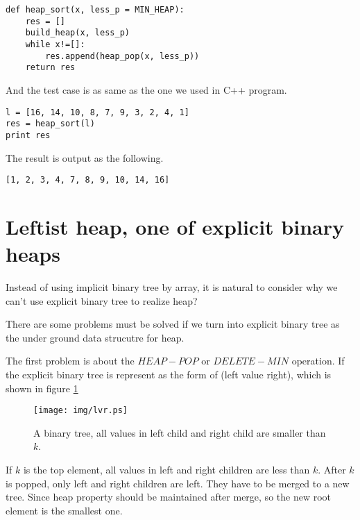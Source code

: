 \documentclass{article}
\begin{document}
\lstset{language=Python}
\begin{lstlisting}
def heap_sort(x, less_p = MIN_HEAP):
    res = []
    build_heap(x, less_p)
    while x!=[]:
        res.append(heap_pop(x, less_p))
    return res
\end{lstlisting}

And the test case is as same as the one we used in C++ program.

\begin{lstlisting}
l = [16, 14, 10, 8, 7, 9, 3, 2, 4, 1]
res = heap_sort(l)
print res
\end{lstlisting}

The result is output as the following.

\begin{verbatim}
[1, 2, 3, 4, 7, 8, 9, 10, 14, 16]
\end{verbatim}

\section{Leftist heap, one of explicit binary heaps}
\label{ebheap}

Instead of using implicit binary tree by array, it is natural to 
consider why we can't use explicit binary tree to realize heap?

There are some problems must be solved if we turn into explicit
binary tree as the under ground data strucutre for heap.

The first problem is about the $HEAP-POP$ or $DELETE-MIN$ operation.
If the explicit binary tree is represent as the form of 
(left value right), which is shown in figure \ref{fig:lvr}

\begin{figure}[htbp]
       \begin{center}
       	  \texttt{[image: img/lvr.ps]}
        \caption{A binary tree, all values in left child and right child are smaller than $k$.} \label{fig:lvr}
       \end{center}
\end{figure}

If $k$ is the top element, all values in left and right children are less
than $k$. After $k$ is popped, only left and right children are left.
They have to be merged to a new tree. Since heap property should be maintained
after merge, so the new root element is the smallest one.
\end{document}
